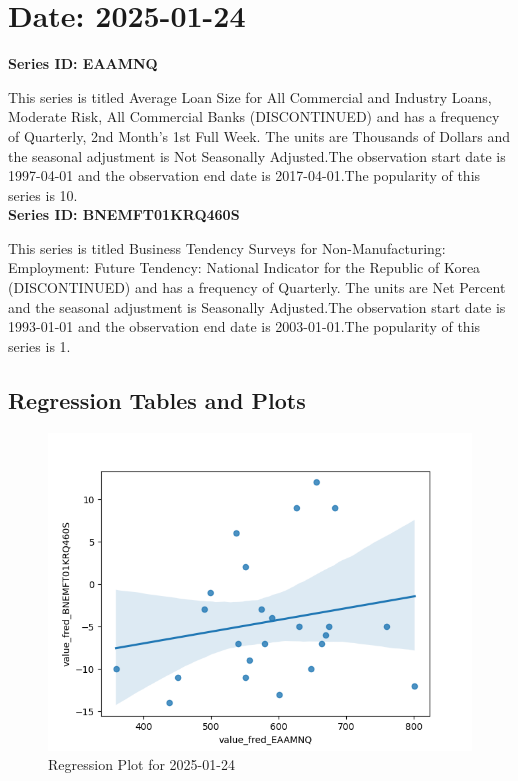 \section{Date: 2025-01-24}
\noindent \textbf{Series ID: EAAMNQ} 

\noindent This series is titled Average Loan Size for All Commercial and Industry Loans, Moderate Risk, All Commercial Banks (DISCONTINUED) and has a frequency of Quarterly, 2nd Month's 1st Full Week. The units are Thousands of Dollars and the seasonal adjustment is Not Seasonally Adjusted.The observation start date is 1997-04-01 and the observation end date is 2017-04-01.The popularity of this series is 10. \\ 

\noindent \textbf{Series ID: BNEMFT01KRQ460S} 

\noindent This series is titled Business Tendency Surveys for Non-Manufacturing: Employment: Future Tendency: National Indicator for the Republic of Korea (DISCONTINUED) and has a frequency of Quarterly. The units are Net Percent and the seasonal adjustment is Seasonally Adjusted.The observation start date is 1993-01-01 and the observation end date is 2003-01-01.The popularity of this series is 1. \\ 

\subsection{Regression Tables and Plots}


\begin{figure}
\centering
\includegraphics[scale = 0.9]{plots/plot_2025-01-24.png}
\caption{Regression Plot for 2025-01-24}
\end{figure}
\newpage

